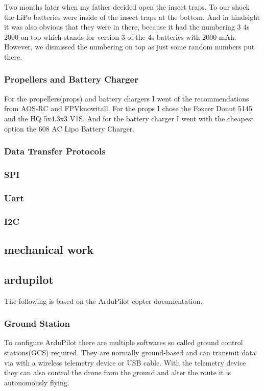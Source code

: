 \documentclass{article}
\begin{document}
	Two months later when my father decided open the insect traps. To our shock the LiPo batteries were inside of the insect traps at the bottom. And in hindsight it was also obvious that they were in there, because it had the numbering 3 4s 2000 on top which stands for version 3 of the 4s batteries with 2000 mAh. However, we dismissed the numbering on top as just some random numbers put there. 
	
	\subsubsection{Propellers and Battery Charger}
	For the propellers(props) and battery chargers I went of the recommendations from AOS-RC and FPVknowitall. For the props I chose the Foxeer Donut 5145\cite{toroidal} and the HQ 5x4.3x3 V1S\cite{hqprops}. And for the battery charger I went with the cheapest option the 608 AC Lipo Battery Charger\cite{lipocharger}.

\subsubsection{Data Transfer Protocols}
	\subsubsection*{SPI}
	\subsubsection*{Uart}
	\subsubsection*{I2C}
	
	
	
	
	\subsection{mechanical work}
	
	\subsection{ardupilot}
	The following is based on the ArduPilot copter documentation\cite{ardupilotdocs}.
	\subsubsection{Ground Station}
	To configure ArduPilot there are multiple softwares so called ground control stations(GCS) required. They are normally ground-based and can transmit data via with a wireless telemetry device or USB cable.  With the telemetry device they can also control the drone from the ground and alter the route it is autonomously flying. 
	
\end{document}
